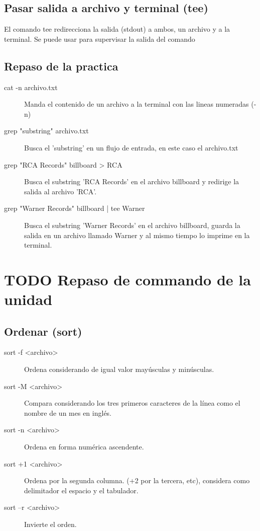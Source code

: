 \documentclass[11pt]{article}
\begin{document}
\subsection{Pasar salida a archivo y terminal (tee)}
\label{sec:org5982569}
El comando tee redirecciona la salida (stdout) a ambos, un archivo y a
la terminal. Se puede usar para supervisar la salida del comando

\subsection{Repaso de la practica}
\label{sec:org297c265}
\begin{description}
\item[{cat -n archivo.txt}] Manda el contenido de un archivo a la terminal
con las lineas numeradas (-n)

\item[{grep "substring" archivo.txt}] Busca el 'substring' en un flujo de
entrada, en este caso el archivo.txt

\item[{grep "RCA Records" billboard > RCA}] Busca el substring 'RCA
Records' en el archivo billboard y redirige la salida al archivo
'RCA'.

\item[{grep "Warner Records" billboard | tee Warner}] Busca el substring
'Warner Records' en el archivo billboard, guarda la salida en un
archivo llamado Warner y al mismo tiempo lo imprime en la terminal.
\end{description}

\section{{\bfseries\sffamily TODO} Repaso de commando de la unidad}
\label{sec:orgbce3516}
\subsection{Ordenar (sort)}
\label{sec:org0ba603b}
\begin{description}
\item[{sort -f <archivo>}] Ordena considerando de igual valor mayúsculas y minúsculas.

\item[{sort -M <archivo>}] Compara considerando los tres primeros caracteres de la línea como
el nombre de un mes en inglés.

\item[{sort -n <archivo>}] Ordena en forma numérica ascendente.

\item[{sort +1 <archivo>}] Ordena por la segunda columna. (+2 por la tercera, etc), considera
como delimitador el espacio y el tabulador.

\item[{sort –r <archivo>}] Invierte el orden.
\end{description}
\end{document}
